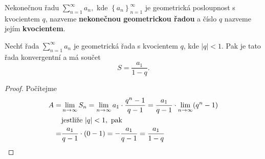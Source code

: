 \begin{definition}
Nekonečnou řadu $\sum_{n=1}^\infty a_n,$ kde $\left \{ a_n \right \}_{n=1}^\infty $
je geometrická posloupnost s kvocientem $q$, nazveme \textbf{nekonečnou geometrickou
řadou} a číslo $q$ nazveme jejím \textbf{kvocientem}.
\end{definition}

\begin{veta}
    Nechť řada $\sum_{n=1}^\infty a_n$ je geometrická řada s kvocientem $q$, kde
    $|q|<1.$ Pak je tato řada konvergentní a má součet
    $$S=\frac{a_1}{1-q}.$$
\end{veta}

\begin{proof}
Počítejme
\begin{align*}
    A =&\lim_{n\to\infty} S_n = \lim_{n\to\infty}a_1\cdot \frac{q^n - 1}{q-1}=\frac{a_1}{q-1}\cdot \lim_{n\to\infty}(q^n-1)\\
    & \textrm{jestliže } |q|<1, \textrm{ pak} \\
    = & \frac{a_1}{q-1}\cdot (0-1)=-\frac{a_1}{q-1}=\frac{a_1}{1-q}\qedhere
\end{align*}
\end{proof}
